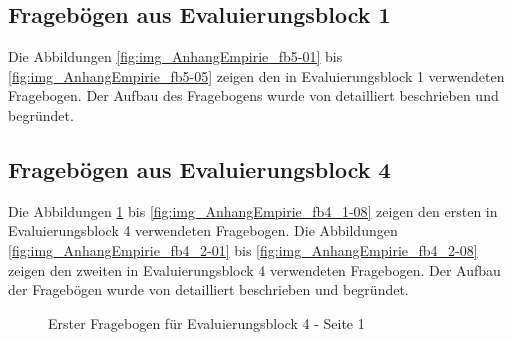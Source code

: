 \subsection{Fragebögen aus Evaluierungsblock 1}
\label{sub:fb_eval1}

Die Abbildungen \ref{fig:img_AnhangEmpirie_fb5-01} bis \ref{fig:img_AnhangEmpirie_fb5-05} zeigen den in Evaluierungsblock 1 verwendeten Fragebogen. Der Aufbau des Fragebogens wurde von \cite{Bohninger10} detailliert beschrieben und begründet.

\subsection{Fragebögen aus Evaluierungsblock 4}
\label{sub:fb_eval4}

Die Abbildungen \ref{fig:img_AnhangEmpirie_fb4_1-01} bis \ref{fig:img_AnhangEmpirie_fb4_1-08} zeigen den ersten in Evaluierungsblock 4 verwendeten Fragebogen. Die Abbildungen \ref{fig:img_AnhangEmpirie_fb4_2-01} bis \ref{fig:img_AnhangEmpirie_fb4_2-08} zeigen den zweiten in Evaluierungsblock 4 verwendeten Fragebogen. Der Aufbau der Fragebögen wurde von \citet{Wahlmuller10} detailliert beschrieben und begründet.

\begin{figure}[htbp]
	\centering
	\caption{Erster Fragebogen für Evaluierungsblock 4 - Seite 1}
	\label{fig:img_AnhangEmpirie_fb4_1-01}
\end{figure}

